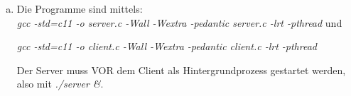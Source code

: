 \documentclass[numbers=noendperiod]{scrartcl}
\begin{document}
\begin{enumerate}[a)]
	\item 
	
	
	Die Programme sind mittels:\\
	
	\textit{gcc -std=c11 -o server.c -Wall -Wextra -pedantic server.c -lrt -pthread} und
	
	\textit{gcc -std=c11 -o client.c -Wall -Wextra -pedantic client.c -lrt -pthread}
	
	Der Server muss VOR dem Client als Hintergrundprozess gestartet werden, also mit \textit{./server \&}.
\end{enumerate}
\end{document}
